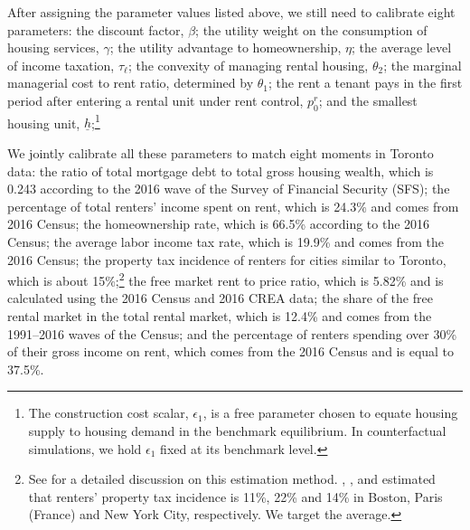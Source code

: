 \documentclass[parskip=full]{article}
\begin{document}
After assigning the parameter values listed above, we still need to calibrate eight parameters: the discount factor, $\beta$; the utility weight on the consumption of housing services, $\gamma$; the utility advantage to homeownership, $\eta$; the average level of income taxation, $\tau_{\ell}$; the convexity of managing rental housing, $\theta_{2}$; the marginal managerial cost to rent ratio, determined by $\theta_{1}$; the rent a tenant pays in the first period after entering a rental unit under rent control, $p^{r}_{0}$; and the smallest housing unit, $\underline{h}$;\footnote{The construction cost scalar, $\epsilon_{1}$, is a free parameter chosen to equate housing supply to housing demand in the benchmark equilibrium. In counterfactual simulations, we hold $\epsilon_{1}$ fixed at its benchmark level.}

We jointly calibrate all these parameters to match eight moments in Toronto data: the ratio of total mortgage debt to total gross housing wealth, which is 0.243 according to the 2016 wave of the Survey of Financial Security (SFS); the percentage of total renters' income spent on rent, which is 24.3\% and comes from 2016 Census; the homeownership rate, which is 66.5\% according to the 2016 Census; the average labor income tax rate, which is 19.9\% and comes from the 2016 Census; the property tax incidence of renters for cities similar to Toronto, which is about 15\%;\footnote{See \citet{rs-2023} for a detailed discussion on this estimation method. \citet{cy-1994}, \citet{fack-2006}, and \citet{sy-2020} estimated that renters' property tax incidence is 11\%, 22\% and 14\% in Boston, Paris (France) and New York City, respectively. We target the average.} the free market rent to price ratio, which is 5.82\% and is calculated using the 2016 Census and 2016 CREA data; the share of the free rental market in the total rental market, which is 12.4\% and comes from the 1991--2016 waves of the Census; and the percentage of renters spending over 30\% of their gross income on rent, which comes from the 2016 Census and is equal to 37.5\%.
\end{document}
